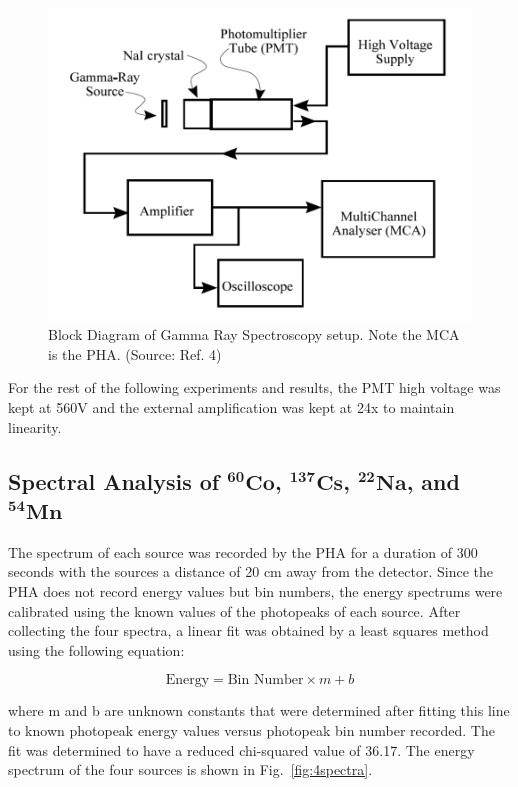 \documentclass[%
 aip,
rsi,%
 amsmath,amssymb,
 reprint,%
author-numerical,%
]{revtex4-1}
\begin{document}
\begin{figure}[H]
\includegraphics[width=1\linewidth]{lateximages/block.png} 
\caption{\label{fig:block} Block Diagram of Gamma Ray Spectroscopy setup. Note the MCA is the PHA. (Source: Ref. 4)}
\end{figure}

\indent For the rest of the following experiments and results, the PMT high voltage was kept at 560V and the external amplification was kept at 24x to maintain linearity.

\subsection{Spectral Analysis of $^ {\textbf{60}}\textbf{Co}$, $^ {\textbf{137}}\textbf{Cs}$, $^ {\textbf{22}}\textbf{Na}$, and $^ {\textbf{54}}\textbf{Mn}$}
The spectrum of each source was recorded by the PHA for a duration of 300 seconds with the sources a distance of 20 cm away from the detector. Since the PHA does not record energy values but bin numbers, the energy spectrums were calibrated using the known values of the photopeaks of each source. After collecting the four spectra, a linear fit was obtained by a least squares method using the following equation:

\begin{equation}
\text{Energy}=\text{Bin Number}\times m+b
 \label{eq:nine}
\end{equation}

\noindent where m and b are unknown constants that were determined after fitting this line to known photopeak energy values versus photopeak bin number recorded. The fit was determined to have a reduced chi-squared value of 36.17. The energy spectrum of the four sources is shown in Fig.~\ref{fig:4spectra}. 
\end{document}
